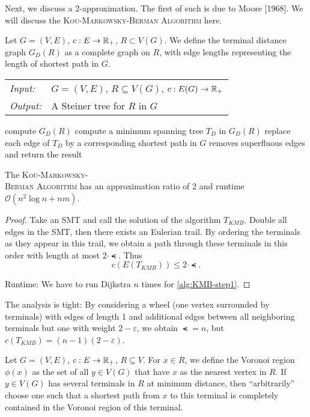 \documentclass[../skript.tex]{subfiles}
\begin{document}
Next, we discuss a 2-approximation. The first of such is due to Moore [1968]. We will discuss the \textsc{Kou-Markowsky-Berman Algorithm} here.

Let $G = (V, E)$, $c : E \to \mathbb{R}_+$, $R \subset V(G)$. We define the terminal distance graph $G_D(R)$ as a complete graph on $R$, with edge lengths representing the length of shortest path in $G$.
\begin{algorithmbox}
\begin{tabular}{@{}ll}
\textit{Input:} & $G = (V, E)$, $R \subseteq V(G)$, $c : E(G) \to \mathbb{R}_+$\\
\textit{Output:} & A Steiner tree for $R$ in $G$
\end{tabular}
\end{algorithmbox}
\vspace{-7pt}
\begin{algorithm}[H]
compute $G_D(R)$\label{alg:KMB-step1}\;
compute a minimum spanning tree $T_D$ in $G_D(R)$\;
replace each edge of $T_D$ by a corresponding shortest path in $G$\;
removes superfluous edges and return the result\;
\end{algorithm}
\vspace{-7pt}
\EndAlgorithmLine
\begin{theorem} %
\label{thm:69}
The \textsc{Kou-Markowsky-\\Berman Algorithm} has an approximation ratio of 2 and runtime $\mathcal{O}(n^2 \log n + nm)$.
\end{theorem}
\begin{proof}
Take an \ac{SMT} and call the solution of the algorithm $T_{KMB}$.
Double all edges in the \ac{SMT}, then there exists an Eulerian trail. By ordering the terminals as they appear in this trail, we obtain a path through these terminals in this order with length at most $2 \cdot \smt$. Thus
\[
c(E(T_{KMB})) \leq 2 \cdot \smt.
\]

Runtime: We have to run Dijkstra $n$ times for \cref{alg:KMB-step1}.
\end{proof}
\begin{remark}
The analysis is tight: By considering a wheel (one vertex surrounded by terminals) with edges of length 1 and additional edges between all neighboring terminals but one with weight $2 - \varepsilon$, we obtain $\smt = n$, but $c(T_{KMB}) = (n-1)(2-\varepsilon)$. 
\end{remark}
Let $G = (V, E)$, $c : E \to \mathbb{R}_+$, $R \subseteq V$.
For $x \in R$, we define the Voronoi region $\phi(x)$ as the set of all $y \in V(G)$ that have $x$ as the nearest vertex in $R$.
If $y \in V(G)$ has several terminals in $R$ at minimum distance, then ``arbitrarily'' choose one such that a shortest path from $x$ to this terminal is completely contained in the Voronoi region of this terminal.
\end{document}
